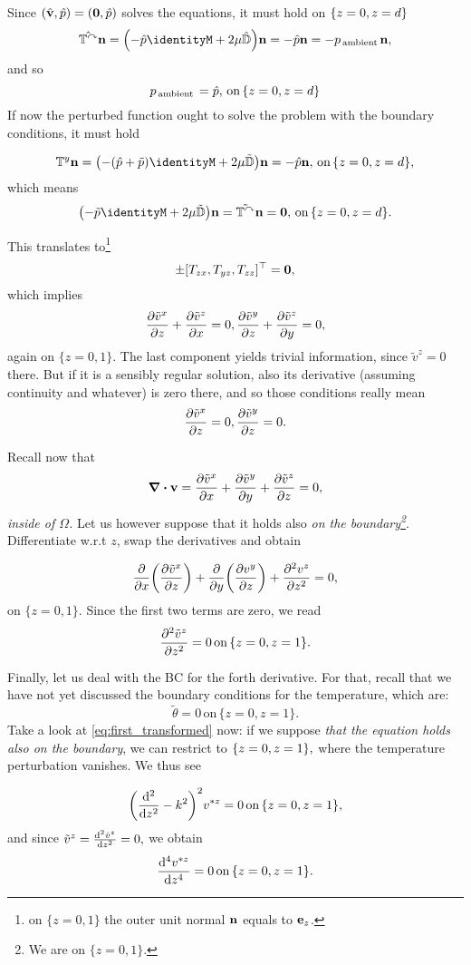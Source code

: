 \documentclass[../main.tex]{subfiles}
\begin{document}
Since $(\hat{\vb{v}}, \hat{p}) = \qty(\vb{0}, \hat{p})$ solves the equations, it must hold  on $\qty{z = 0, z =d}$
\[
	\hat{\cstress}\vb{n} = \qty(-\hat{p} \identityM + 2 \mu \hat{\symvgrad})\vb{n} = - \hat{p} \vb{n} =  - p_{\, \text{ambient} \,}\vb{n},
\]
and so
\[
	p_{\, \text{ambient} \,} = \hat{p}, \, \text{on} \, \qty{z =0, z=d}
\]
If now the perturbed function ought to solve the problem with the boundary conditions, it must hold

\[
	\cstress \vb{n} = \qty(-\qty(\hat{p} + \tilde{p})\identityM + 2 \mu \tilde{\symvgrad})\vb{n} = - \hat{p} \vb{n}, \, \text{on} \, \qty{z=0, z=d},
\]
which means
\[
	\qty(-\tilde{p}\identityM + 2 \mu \tilde{\symvgrad})\vb{n} = \tilde{\cstress}\vb{n} = \vb{0} , \, \text{on} \, \qty{z = 0, z =d}.
\]

This translates to\footnote{on $\{z = 0,1\}$ the outer unit normal $\vb{n}$ equals to $\vb{e}_z$.}
\[
	\pm[T_{zx}, T_{yz}, T_{zz}]^\top = \vb{0},
\]
which implies
\[
	\pdv{\tilde{v}^x}{z} + \pdv{\tilde{v}^z}{x} = 0, \pdv{\tilde{v}^y}{z}+ \pdv{\tilde{v}^z}{y} = 0,
\]
again on $\{z = 0,1\}.$ The last component yields trivial information, since $\tilde{v}^z = 0$ there. But if it is a sensibly regular solution, also its derivative (assuming continuity and whatever) is zero there, and so those conditions really mean
\[
	\pdv{\tilde{v}^x}{z} = 0, \pdv{\tilde{v}^y}{z} = 0.
\]

Recall now that
\[
	\divergence{\vb{v}} = \pdv{\tilde{v}^x}{x}+ \pdv{\tilde{v}^y}{y} + \pdv{\tilde{v}^z}{z} = 0,
\]
\textit{inside of $\Omega$.} Let us however suppose that it holds also \textit{on the boundary\footnote{We are on $\{z = 0,1\}$.}}. Differentiate w.r.t $z$, swap the derivatives and obtain

\[
	\pdv{x}\qty(\pdv{\tilde{v}^x}{z})+\pdv{y}\qty(\pdv{v^y}{z})+\pdv[2]{v^z}{z} = 0,
\]
on $\{z = 0,1\}.$ Since the first two terms are zero, we read
\[
	\pdv[2]{\tilde{v}^z}{z} = 0 \, \text{on} \, \{z = 0, z = 1\}.
\]

Finally, let us deal with the BC for the forth derivative. For that, recall that we have not yet discussed the boundary conditions for the temperature, which are:
\[
	\tilde{\theta} = 0 \, \text{on} \, \{z = 0, z= 1\}.
\]
Take a look at \ref{eq:first_transformed} now: if we suppose \textit{that the equation holds also on the boundary}, we can restrict to $\qty{z=0, z=1},$ where the temperature perturbation vanishes. We thus see

\[
	\qty(\dv[2]{z}-k^{2})^{2}v^{*z} = 0 \, \text{on} \, \{z = 0, z = 1\},
\]
and since $\tilde{v}^z = \dv[2]{\hat{v}^z}{z} = 0,$ we obtain
\[
	\dv[4]{v^{*z}}{z} = 0 \, \text{on} \, \{z = 0, z = 1\}.
\]
\end{document}

